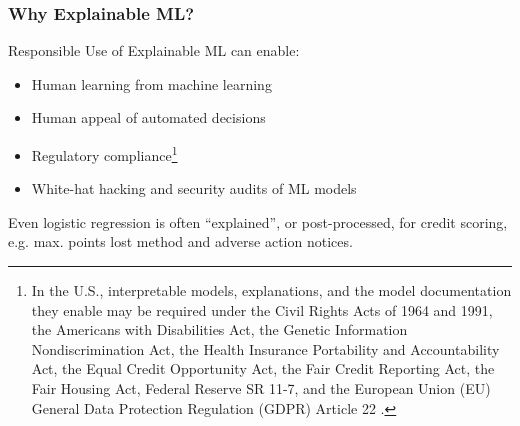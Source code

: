 \documentclass[11pt,aspectratio=169,hyperref={colorlinks}]{beamer}
\begin{document}
	\begin{frame}
	
		\frametitle{Why Explainable ML?}
		
		Responsible Use of Explainable ML can enable:
		\begin{itemize}
			\item Human learning from machine learning
			\item Human appeal of automated decisions
			\item Regulatory compliance\footnote{\tiny{In the U.S., interpretable models, explanations, and the model documentation they enable may be required under the Civil Rights Acts of 1964 and 1991, the Americans with Disabilities Act, the Genetic Information Nondiscrimination Act, the Health Insurance Portability and Accountability Act, the Equal Credit Opportunity Act, the Fair Credit Reporting Act, the Fair Housing Act, Federal Reserve SR 11-7, and the European Union (EU) General Data Protection Regulation (GDPR) Article 22 \cite{ff_interpretability}.}}
			\item White-hat hacking and security audits of ML models
		\end{itemize}
		\vspace{10pt}
		Even logistic regression is often ``explained'',  or post-processed, for credit scoring, e.g. max. points lost method and adverse action notices.

	\end{frame}
\end{document}
